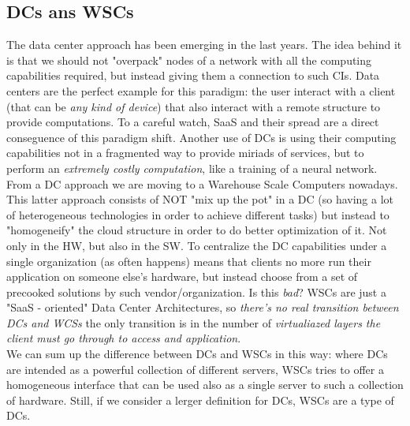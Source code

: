 \documentclass[10pt,a4paper]{article}
\begin{document}
			\subsection{DCs ans WSCs}
				The data center approach has been emerging in the last years. The idea behind it is that we should not "overpack" nodes of a network with all the computing capabilities required, but instead giving them a connection to such CIs. Data centers are the perfect example for this paradigm: the user interact with a client (that can be \emph{any kind of device}) that also interact with a remote structure to provide computations. To a careful watch, SaaS and their spread are a direct conseguence of this paradigm shift. Another use of DCs is using their computing capabilities not in a fragmented way to provide miriads of services, but to perform an \emph{extremely costly computation}, like a training of a neural network.\\
				From a DC approach we are moving to a Warehouse Scale Computers nowadays. This latter approach consists of NOT "mix up the pot" in a DC (so having a lot of heterogeneous technologies in order to achieve different tasks) but instead to "homogeneify" the cloud structure in order to do better optimization of it. Not only in the HW, but also in the SW. To centralize the DC capabilities under a single organization (as often happens) means that clients no more run their application on someone else's hardware, but instead choose from a set of precooked solutions by such vendor/organization. Is this \emph{bad}? WSCs are just a "SaaS - oriented" Data Center Architectures, so \emph{there's no real transition between DCs and WCSs} the only transition is in the number of \emph{virtualiazed layers the client must go through to access and application}.\\
				We can sum up the difference between DCs and WSCs in this way: where DCs are intended as a powerful collection of different servers, WSCs tries to offer a homogeneous interface that can be used also as a single server to such a collection of hardware. Still, if we consider a lerger definition for DCs, WSCs are a type of DCs. 
				
\end{document}
